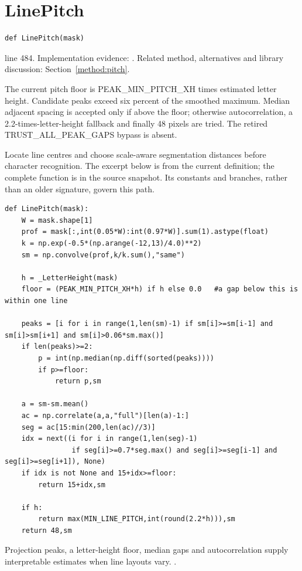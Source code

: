 \section{LinePitch}\label{fn:segment:LinePitch}
\begin{lstlisting}[style=sig]
def LinePitch(mask)
\end{lstlisting}
 line 484. Implementation evidence: \cite{code2026}. Related method, alternatives and library discussion: Section~\ref{method:pitch}.


The current pitch floor is PEAK\_MIN\_PITCH\_XH times estimated letter height. Candidate peaks exceed six percent of the smoothed maximum. Median adjacent spacing is accepted only if above the floor; otherwise autocorrelation, a 2.2-times-letter-height fallback and finally 48 pixels are tried. The retired TRUST\_ALL\_PEAK\_GAPS bypass is absent.


Locate line centres and choose scale-aware segmentation distances before character recognition. The excerpt below is from the current definition; the complete function is in the source snapshot. Its constants and branches, rather than an older signature, govern this path.


\begin{lstlisting}[style=plain]
def LinePitch(mask):
    W = mask.shape[1]
    prof = mask[:,int(0.05*W):int(0.97*W)].sum(1).astype(float)
    k = np.exp(-0.5*(np.arange(-12,13)/4.0)**2)
    sm = np.convolve(prof,k/k.sum(),"same")

    h = _LetterHeight(mask)
    floor = (PEAK_MIN_PITCH_XH*h) if h else 0.0   #a gap below this is within one line

    peaks = [i for i in range(1,len(sm)-1) if sm[i]>=sm[i-1] and sm[i]>sm[i+1] and sm[i]>0.06*sm.max()]
    if len(peaks)>=2:
        p = int(np.median(np.diff(sorted(peaks))))
        if p>=floor:
            return p,sm

    a = sm-sm.mean()
    ac = np.correlate(a,a,"full")[len(a)-1:]
    seg = ac[15:min(200,len(ac)//3)]
    idx = next((i for i in range(1,len(seg)-1)
                if seg[i]>=0.7*seg.max() and seg[i]>=seg[i-1] and seg[i]>=seg[i+1]), None)
    if idx is not None and 15+idx>=floor:
        return 15+idx,sm

    if h:
        return max(MIN_LINE_PITCH,int(round(2.2*h))),sm
    return 48,sm
\end{lstlisting}
Projection peaks, a letter-height floor, median gaps and autocorrelation supply interpretable estimates when line layouts vary. \cite{postl1986,scipypeaks}.



